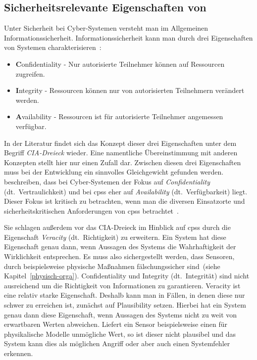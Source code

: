 \documentclass[final,bibliography=totocnumbered]{include/sikseminar}
\newcommand{\fb}[1]{\dofb#1}
\newcommand{\cps}{\glspl{cps}\xspace}
\newcommand{\dofb}[1]{\textbf{#1}\nobreak\hspace{0pt}}
\begin{document}
    \subsection{Sicherheitsrelevante Eigenschaften von }
    \label{subsec:definition}
    Unter Sicherheit bei Cyber-Systemen versteht man im Allgemeinen Informationssicherheit.
    Informationssicherheit kann man durch drei Eigenschaften von Systemen charakterisieren~\cite{CH13}:
    \begin{itemize}[noitemsep,wide=0pt]
        \item \fb{Confidentiality} - Nur autorisierte Teilnehmer können auf Ressourcen zugreifen.
        \item \fb{Integrity} - Ressourcen können nur von autorisierten Teilnehmern verändert werden.
        \item \fb{Availability} - Ressourcen ist für autorisierte Teilnehmer angemessen verfügbar.
    \end{itemize}

    In der Literatur findet sich das Konzept dieser drei Eigenschaften unter dem Begriff \textit{CIA-Dreieck} wieder.
    Eine namentliche Übereinstimmung mit anderen Konzepten stellt hier nur einen Zufall dar.
    Zwischen diesen drei Eigenschaften muss bei der Entwicklung ein sinnvolles Gleichgewicht gefunden werden.
    \citeauthor{GK16}~\cite{GK16} beschreiben, dass bei Cyber-Systemen der Fokus auf \textit{Confidentiality} (dt.\ Vertraulichkeit) und bei \cps eher auf \textit{Availability} (dt.\ Verfügbarkeit) liegt.
    Dieser Fokus ist kritisch zu betrachten, wenn man die diversen Einsatzorte und sicherheitskritischen Anforderungen von \cps betrachtet~\cite{GK16}.

    Sie schlagen außerdem vor das CIA-Dreieck im Hinblick auf \cps durch die Eigenschaft \textit{Veracity} (dt.~Richtigkeit) zu erweitern.
    Ein System hat diese Eigenschaft genau dann, wenn Aussagen des Systems die Wahrhaftigkeit der Wirklichkeit entsprechen.
    Es muss also sichergestellt werden, dass Sensoren, durch beispielsweise physische Maßnahmen fälschungssicher sind~(siehe Kapitel~\ref{physisch-orga}).
    Confidentiality und Integrity (dt.\ Integrität) sind nicht ausreichend um die Richtigkeit von Informationen zu garantieren.
    Veracity ist eine relativ starke Eigenschaft.
    Deshalb kann man in Fällen, in denen diese nur schwer zu erreichen ist, zunächst auf Plausibility setzen.
    Hierbei hat ein System genau dann diese Eigenschaft, wenn Aussagen des Systems nicht zu weit von erwartbaren Werten abweichen.
    Liefert ein Sensor beispielsweise einen für physikalische Modelle unmögliche Wert, so ist dieser nicht plausibel und das System kann dies als möglichen Angriff oder aber auch einen Systemfehler erkennen.~\cite{GK16,KLG15}
\end{document}
